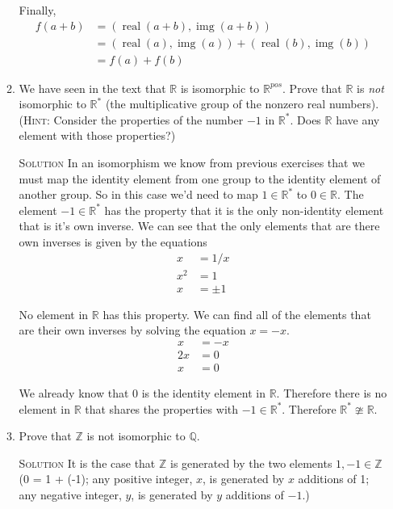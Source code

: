 \documentclass[twoside]{amsart}
\newcommand{\Reals}{\ensuremath{\mathbb{R}}\xspace}
\newcommand{\Integers}{\ensuremath{\mathbb{Z}{}}\xspace}
\newcommand{\solution}{\textsc{Solution}\xspace}
\newcommand{\niso}{\ncong}
\newcommand{\blank}{\vspace{5pt}}
\newcommand{\real}{\mathop{\mathrm{real}}}
\newcommand{\img}{\mathop{\mathrm{img}}}
\begin{document}
\begin{enumerate}[A.]
\begin{enumerate}[1]
      Finally,
      \begin{align*}
         f(a + b) &= (\real(a + b), \img(a + b))  \\
                  &= (\real(a),\img(a)) + (\real(b),\img(b)) \\
                  &= f(a) + f(b)
      \end{align*}

      \item We have seen in the text that $\Reals$ is isomorphic to 
      $\Reals^{pos}$. Prove that $\Reals$ is \emph{not} isomorphic
      to $\Reals^*$ (the multiplicative group of the nonzero real numbers).
      (\textsc{Hint}: Consider the properties of the number $-1$ in
      $\Reals^*$. Does $\Reals$ have any element with those properties?)


      \blank \noindent \solution In an isomorphism we know from previous
      exercises that we must map the identity element from one group
      to the identity element of another group. So in this case
      we'd need to map $1 \in \Reals^*$ to $0 \in \Reals$. The
      element $-1 \in \Reals^*$ has the property that it is the only
      non-identity element that is it's own inverse. We can see
      that the only elements that are there own inverses is given by
      the equations
      \begin{align*}
         x &= 1/x \\ 
         x^2 &= 1 \\
         x &= \pm 1
      \end{align*}

      No element in $\Reals$ has this property. We can find all
      of the elements that are their own inverses by solving the 
      equation $x = -x$.
      \begin{align*}
          x &= -x \\
          2x &= 0 \\
          x &= 0
      \end{align*}

      We already know that 0 is the identity element in $\Reals$. Therefore
      there is no element in $\Reals$ that shares the properties with
      $-1 \in \Reals^*$. Therefore $\Reals^* \niso \Reals$.

      \blank
      \item Prove that $\Integers$ is not isomorphic to $\mathbb{Q}$.

      \blank \noindent \solution It is the case that $\Integers$ is
      generated by the two elements $1, -1 \in \Integers$ (0 = 1 + (-1);
      any positive integer, $x$, is generated by $x$ additions of 1;
      any negative integer, $y$, is generated by $y$ additions of $-1$.)


\end{enumerate}
\end{enumerate}
\end{document}
